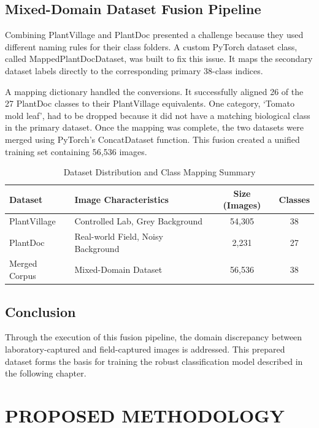 \documentclass[12pt, a4paper]{report}
\begin{document}
\section{Mixed-Domain Dataset Fusion Pipeline}
Combining PlantVillage and PlantDoc presented a challenge because they used different naming rules for their class folders. A custom PyTorch dataset class, called MappedPlantDocDataset, was built to fix this issue. It maps the secondary dataset labels directly to the corresponding primary 38-class indices. 

A mapping dictionary handled the conversions. It successfully aligned 26 of the 27 PlantDoc classes to their PlantVillage equivalents. One category, `Tomato mold leaf', had to be dropped because it did not have a matching biological class in the primary dataset. Once the mapping was complete, the two datasets were merged using PyTorch's ConcatDataset function. This fusion created a unified training set containing 56,536 images.

\begin{table}[h!]
\centering
\caption{Dataset Distribution and Class Mapping Summary}
\vspace{0.3cm}
\begin{tabular}{@{}llcc@{}}
\toprule
\textbf{Dataset} & \textbf{Image Characteristics} & \textbf{Size (Images)} & \textbf{Classes} \\
\midrule
PlantVillage & Controlled Lab, Grey Background & 54,305 & 38 \\
PlantDoc & Real-world Field, Noisy Background & 2,231 & 27 \\
Merged Corpus & Mixed-Domain Dataset & 56,536 & 38 \\
\bottomrule
\end{tabular}
\end{table}

\section{Conclusion}
Through the execution of this fusion pipeline, the domain discrepancy between laboratory-captured and field-captured images is addressed. This prepared dataset forms the basis for training the robust classification model described in the following chapter.

\chapter{PROPOSED METHODOLOGY}
\end{document}
